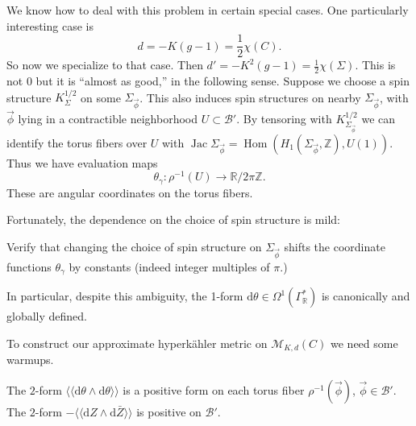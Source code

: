 \documentclass[12pt,letterpaper,reqno]{article}
\numberwithin{equation}{section}
\newcommand{\cB}{\ensuremath{\mathcal B}}
\newcommand{\cM}{\ensuremath{\mathcal M}}
\newcommand{\cH}{\ensuremath{\mathcal H}}
\newcommand{\R}{\ensuremath{\mathbb R}}
\newcommand{\Z}{\ensuremath{\mathbb Z}}
\newcommand{\half}{\ensuremath{\frac{1}{2}}}
\newcommand{\hk}{hyperk\"ahler\xspace}
\newcommand{\de}{\mathrm{d}}
\newcommand{\IP}[1]{\langle#1\rangle}
\newcommand{\DIP}[1]{\langle\!\langle#1\rangle\!\rangle}
\DeclareMathOperator{\Hom}{Hom}
\DeclareMathOperator{\Jac}{Jac}
\newcommand{\fixme}[1]{{\color{orange}{[#1]}}}
\begin{document}
We know how to deal with this problem
in certain special cases. One particularly
interesting case is
\begin{equation}
d = -K(g-1) = \half \chi(C). 
\end{equation}
So now we specialize to that case.
Then $d' = -K^2(g-1) = \half \chi(\Sigma)$. This is not $0$ but it is
``almost as good,'' in the following sense.
Suppose we choose a spin structure
$K_\Sigma^{1/2}$ on some $\Sigma_{\vec \phi}$.
This also induces
spin structures on nearby $\Sigma_{\vec \phi}$,
with $\vec\phi$ lying in a contractible neighborhood $U \subset \cB'$.
By tensoring with $K_{\Sigma_{\vec \phi}}^{1/2}$ we can identify
the torus fibers over $U$ 
with $\Jac \Sigma_{\vec \phi} = \Hom(H_1(\Sigma_{\vec \phi},\Z),U(1))$.
Thus we have evaluation maps
$$ \theta_\gamma: \rho^{-1}(U) \to \R / 2 \pi \Z. $$
These are angular coordinates on the torus fibers.

Fortunately, the dependence on the choice of spin structure is mild:

\begin{exercise} Verify that changing the choice of spin structure
on $\Sigma_{\vec \phi}$
shifts the coordinate functions $\theta_\gamma$ by constants (indeed integer 
multiples of $\pi$.)
\end{exercise}

In particular, despite this ambiguity, 
the 1-form $\de \theta \in \Omega^1(\Gamma^*_\R)$
is canonically and globally defined.


To construct our approximate \hk metric on $\cM_{K,d}(C)$ we need some
warmups.

\begin{prop} \label{prop:polarization}
The $2$-form $\DIP{\de \theta \wedge \de \theta}$ is a positive
form on each torus fiber $\rho^{-1}(\vec\phi)$, $\vec\phi \in \cB'$.
The $2$-form $-\DIP{\de Z \wedge \de \bar{Z}}$ is positive on
$\cB'$.
\end{prop}
\begin{pf} \fixme{...}
\end{pf}
\end{document}
